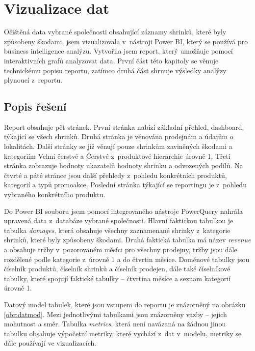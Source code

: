 \chapter{Vizualizace dat}
\label{ch:vizualizace}

Očištěná data vybrané společnosti obsahující záznamy shrinků, které byly způsobeny škodami, jsem vizualizovala v~nástroji Power BI, který se používá pro business intelligence analýzu. Vytvořila jsem report, který umožňuje pomocí interaktivních grafů analyzovat data. První část této kapitoly se věnuje technickému popisu reportu, zatímco druhá část shrnuje výsledky analýzy plynoucí z~reportu.

\section{Popis řešení}
\label{sec:vizualizace:popis}

Report obsahuje pět stránek. První stránka nabízí základní přehled, dashboard, týkající se všech shrinků. Druhá stránka je věnována prodejnám a údajům o lokalitách.
Další stránky se již věnují pouze shrinkům zaviněných škodami a kategoriím Velmi čerstvé a Čerstvé z~produktové hierarchie úrovně 1. Třetí stránka zobrazuje hodnoty ukazatelů hodnoty shrinku a odvozených podílů. Na čtvrté a páté stránce jsou další přehledy z~pohledu konkrétních produktů, kategorií a typů promoakce. Poslední stránka týkající se reportingu je z~pohledu vybraného konkrétního produktu.

Do Power BI souboru jsem pomocí integrovaného nástroje PowerQuery nahrála upravená data z~databáze vybrané společnosti. Hlavní faktickou tabulkou je tabulka \emph{damages}, která obsahuje všechny zaznamenané shrinky z~kategorie shrinků, které byly způsobeny škodami. Druhá faktická tabulka má název \emph{revenue} a obsahuje tržby v~pozorovaném měsíci pro všechny prodejny, tržby jsou dále rozdělené podle kategorie z~úrovně 1 a do čtvrtin měsíce. Doménové tabulky jsou číselník produktů, číselník shrinků a číselník prodejen, dále také číselníkové tabulky, které spojují faktické tabulky -- čtvrtina měsíce a seznam kategorií úrovně 1. 

Datový model tabulek, které jsou vstupem do reportu je znázorněný na obrázku \ref{obr:datmod}. Mezi jednotlivými tabulkami jsou znázorněny vazby -- jejich mohutnost a směr. Tabulka \emph{metrics}, která není navázaná na žádnou jinou tabulku obsahuje výpočetní metriky, které vychází z~dat v~modelu, metriky se dále používají ve vizualizacích.

